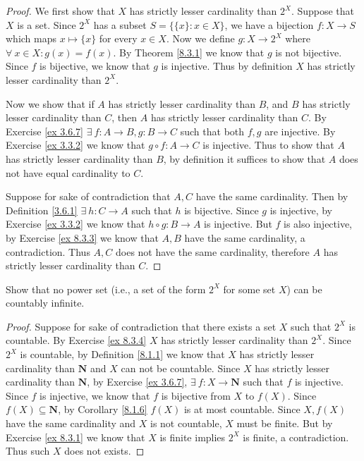 \begin{proof}
    We first show that \(X\) has strictly lesser cardinality than \(2^X\).
    Suppose that \(X\) is a set.
    Since \(2^X\) has a subset \(S = \{\{x\} : x \in X\}\), we have a bijection \(f : X \to S\) which maps \(x \mapsto \{x\}\) for every \(x \in X\).
    Now we define \(g : X \to 2^X\) where \(\forall\ x \in X : g(x) = f(x)\).
    By Theorem \ref{8.3.1} we know that \(g\) is not bijective.
    Since \(f\) is bijective, we know that \(g\) is injective.
    Thus by definition \(X\) has strictly lesser cardinality than \(2^X\).

    Now we show that if \(A\) has strictly lesser cardinality than \(B\), and \(B\) has strictly lesser cardinality than \(C\), then \(A\) has strictly lesser cardinality than \(C\).
    By Exercise \ref{ex 3.6.7} \(\exists\ f : A \to B, g : B \to C\) such that both \(f, g\) are injective.
    By Exercise \ref{ex 3.3.2} we know that \(g \circ f : A \to C\) is injective.
    Thus to show that \(A\) has strictly lesser cardinality than \(B\), by definition it suffices to show that \(A\) does not have equal cardinality to \(C\).

    Suppose for sake of contradiction that \(A, C\) have the same cardinality.
    Then by Definition \ref{3.6.1} \(\exists\ h : C \to A\) such that \(h\) is bijective.
    Since \(g\) is injective, by Exercise \ref{ex 3.3.2} we know that \(h \circ g : B \to A\) is injective.
    But \(f\) is also injective, by Exercise \ref{ex 8.3.3} we know that \(A, B\) have the same cardinality, a contradiction.
    Thus \(A, C\) does not have the same cardinality, therefore \(A\) has strictly lesser cardinality than \(C\).
\end{proof}

\begin{exercise}\label{ex 8.3.5}
    Show that no power set (i.e., a set of the form \(2^X\) for some set \(X\)) can be countably infinite.
\end{exercise}

\begin{proof}
    Suppose for sake of contradiction that there exists a set \(X\) such that \(2^X\) is countable.
    By Exercise \ref{ex 8.3.4} \(X\) has strictly lesser cardinality than \(2^X\).
    Since \(2^X\) is countable, by Definition \ref{8.1.1} we know that \(X\) has strictly lesser cardinality than \(\mathbf{N}\) and \(X\) can not be countable.
    Since \(X\) has strictly lesser cardinality than \(\mathbf{N}\), by Exercise \ref{ex 3.6.7}, \(\exists\ f : X \to \mathbf{N}\) such that \(f\) is injective.
    Since \(f\) is injective, we know that \(f\) is bijective from \(X\) to \(f(X)\).
    Since \(f(X) \subseteq \mathbf{N}\), by Corollary \ref{8.1.6} \(f(X)\) is at most countable.
    Since \(X, f(X)\) have the same cardinality and \(X\) is not countable, \(X\) must be finite.
    But by Exercise \ref{ex 8.3.1} we know that \(X\) is finite implies \(2^X\) is finite, a contradiction.
    Thus such \(X\) does not exists.
\end{proof}